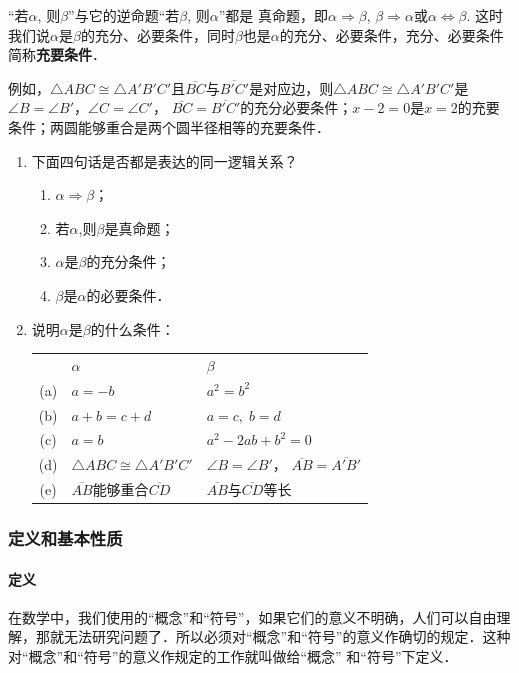 “若$\alpha$, 则$\beta$”与它的逆命题“若$\beta$, 则$\alpha$”都是
真命题，即$\alpha\Rightarrow\beta$, $\beta\Rightarrow\alpha$或$\alpha\Leftrightarrow\beta$. 这时我们说$\alpha$是$\beta$的充分、必要条件，同时$\beta$也是$\alpha$的充分、必要条件，充分、必要条件简称\textbf{充要条件}．

例如，$\triangle ABC\cong \triangle A'B'C'$且$\overline{BC}$与$\overline{B'C'}$是对应边，则$\triangle ABC\cong \triangle A'B'C'$是
$\angle B=\angle B'$，$\angle C=\angle C'$，
$\overline{BC}=\overline{B'C'}$的充分必要条件；$x-2=0$是$x=2$的充要条件；两圆能够重合是两个圆半径相等的充要条件．

\begin{ex}
	\begin{enumerate}
		\item 下面四句话是否都是表达的同一逻辑关系？
		\begin{enumerate}
			\item $\alpha\Rightarrow\beta$；
			\item 若$\alpha$,则$\beta$是真命题；
			\item $\alpha$是$\beta$的充分条件；
			\item $\beta$是$\alpha$的必要条件．
		\end{enumerate}
		
		\item 说明$\alpha$是$\beta$的什么条件：
		
		\begin{tabular}{cll}
			& $\alpha$ &$\beta$\\
			(a)& $a=-b$ &$a^2=b^2$\\
			(b)& $a+b=c+d$ & $a=c,\; b=d$\\
			(c)& $a=b$ & $a^2-2ab+b^2=0$\\
			(d)& $\triangle ABC\cong \triangle A'B'C'$ & $\angle B=\angle B'$，
			$\overline{AB}=\overline{A'B'}$\\
			(e)&  $\overline{AB}$能够重合$\overline{CD}$
			& $\overline{AB}$与$\overline{CD}$等长
		\end{tabular}
	\end{enumerate}
\end{ex}

\subsubsection{定义和基本性质}
\paragraph{定义}
在数学中，我们使用的“概念”和“符号”，如果它们的意义不明确，人们可以自由理解，那就无法研究问题了．所以必须对“概念”和“符号”的意义作确切的规定．这种对“概念”和“符号”的意义作规定的工作就叫做给“概念”
和“符号”下定义．

